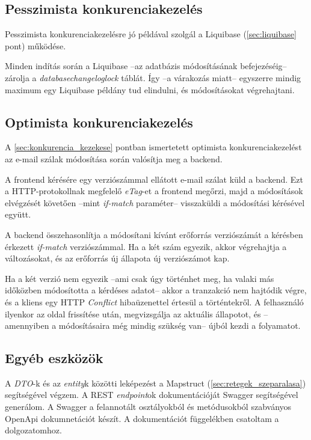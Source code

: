 \subsection{Pesszimista konkurenciakezelés}
Pesszimista konkurenciakezelésre jó példával szolgál a Liquibase (\ref{sec:liquibase} pont) működése. 

Minden indítás során a Liquibase --az adatbázis módosításának befejezéséig-- zárolja a \textit{databasechangeloglock} táblát. Így --a várakozás miatt-- egyszerre mindig maximum egy Liquibase példány tud elindulni, és módosításokat végrehajtani.


\subsection{Optimista konkurenciakezelés}
A \ref{sec:konkurencia_kezekese} pontban ismertetett optimista konkurenciakezelést az e-mail szálak módosítása során valósítja meg a backend.

A frontend kérésére egy verziószámmal ellátott e-mail szálat küld a backend. Ezt a HTTP-protokollnak megfelelő \textit{eTag}-et a frontend megőrzi, majd a módosítások elvégzését követően --mint \textit{if-match} paraméter-- visszaküldi a módosítási kérésével együtt.

A backend összehasonlítja a módosítani kívánt erőforrás verziószámát a kérésben érkezett \textit{if-match} verziószámmal. Ha a két szám egyezik, akkor végrehajtja a változásokat, és az erőforrás új állapota új verziószámot kap.

Ha a két verzió nem egyezik --ami csak úgy történhet meg, ha valaki más időközben módosította a kérdéses adatot-- akkor a tranzakció nem hajtódik végre, és a kliens egy HTTP \textit{Conflict} hibaüzenettel értesül a történtekről. A felhasználó ilyenkor az oldal frissítése után, megvizsgálja az aktuális állapotot, és --amennyiben a módosításaira még mindig szükség van-- újból kezdi a folyamatot.

\subsection{Egyéb eszközök}\label{sec:backend_egyeb_eszkozok}
A \textit{DTO}-k és az \textit{entity}k közötti leképezést a Mapstruct (\ref{sec:retegek_szeparalasa}) segítségével végzem. A REST \textit{endpoint}ok dokumentációját Swagger segítségével generálom. A Swagger a felannotált osztályokból és metódusokból szabványos OpenApi dokumnetációt készít. A dokumentációt  függelékben csatoltam a dolgozatomhoz.



